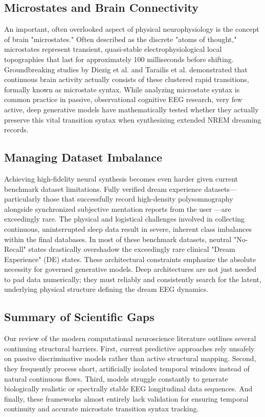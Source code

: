 \documentclass[journal,10pt,twocolumn]{IEEEtran}
\begin{document}
\subsection{Microstates and Brain Connectivity}
An important, often overlooked aspect of physical neurophysiology is the concept of brain "microstates." Often described as the discrete "atoms of thought," microstates represent transient, quasi-stable electrophysiological local topographies that last for approximately 100 milliseconds before shifting. Groundbreaking studies by Diezig et al. \cite{diezig2024eeg} and Tarailis et al. \cite{tarailis2024functional} demonstrated that continuous brain activity actually consists of these clustered rapid transitions, formally known as microstate syntax. While analyzing microstate syntax is common practice in passive, observational cognitive EEG research, very few active, deep generative models have mathematically tested whether they actually preserve this vital transition syntax when synthesizing extended NREM dreaming records.

\subsection{Managing Dataset Imbalance}
Achieving high-fidelity neural synthesis becomes even harder given current benchmark dataset limitations. Fully verified dream experience datasets—particularly those that successfully record high-density polysomnography alongside synchronized subjective mentation reports from the user \cite{wong2023dream}—are exceedingly rare. The physical and logistical challenges involved in collecting continuous, uninterrupted sleep data result in severe, inherent class imbalances within the final databases. In most of these benchmark datasets, neutral "No-Recall" states drastically overshadow the exceedingly rare clinical "Dream Experience" (DE) states. These architectural constraints emphasize the absolute necessity for governed generative models. Deep architectures are not just needed to pad data numerically; they must reliably and consistently search for the latent, underlying physical structure defining the dream EEG dynamics.

\subsection{Summary of Scientific Gaps}
Our review of the modern computational neuroscience literature outlines several continuing structural barriers. First, current predictive approaches rely unsafely on passive discriminative models rather than active structural mapping. Second, they frequently process short, artificially isolated temporal windows instead of natural continuous flows. Third, models struggle constantly to generate biologically realistic or spectrally stable EEG longitudinal data sequences. And finally, these frameworks almost entirely lack validation for ensuring temporal continuity and accurate microstate transition syntax tracking.
\end{document}
